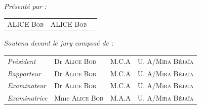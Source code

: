 \begin{titlepage}
\vspace{1.2cm}



\begin{center}
	
	\textit{Présenté par :}\\\bigskip
	
	
	\begin{tabular}{lcr}
		\scshape{ALICE Bob} & \scshape{ALICE Bob}
	\end{tabular}
	
\end{center}



\vspace{0.5cm}

\begin{center}
	\textit{Soutenu devant le jury composé de :}\\\bigskip 
\end{center}
\begin{tabular}{p{3cm}p{6.5cm}p{2cm}p{4cm}}
	\textit{Président}   & Dr \scshape{Alice} Bob & M.C.A &  \scshape{U. A/Mira Béjaïa}\\
	\textit{Rapporteur}  & Dr \scshape{Alice} Bob & M.C.A &  \scshape{U. A/Mira Béjaïa}\\
	\textit{Examinateur} & Dr \scshape{Alice} Bob & M.C.A &  \scshape{U. A/Mira Béjaïa}\\
	\textit{Examinatrice}& Mme \scshape{Alice} Bob & M.A.A & \scshape{U.  A/Mira Béjaïa}\\
\end{tabular}

\vspace{0.7cm}

\vfill

\begin{center}
\end{center}

\end{titlepage}
